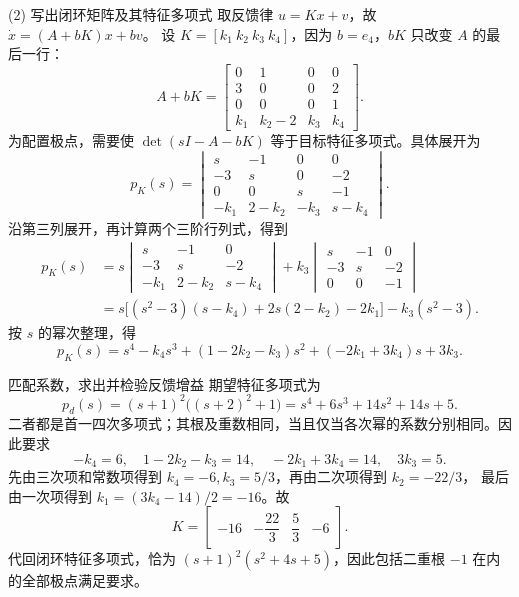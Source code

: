 \documentclass[11pt]{article}
\begin{document}
\begin{solution}
\pagebreak
\begin{proofstep}{(2) 写出闭环矩阵及其特征多项式}
取反馈律 $u=Kx+v$，故 $\dot x=(A+bK)x+bv$。
设 $K=[k_1\ k_2\ k_3\ k_4]$，因为 $b=e_4$，$bK$ 只改变 $A$ 的最后一行：
\[
A+bK=\begin{bmatrix}
0&1&0&0\\3&0&0&2\\0&0&0&1\\k_1&k_2-2&k_3&k_4
\end{bmatrix}.
\]
为配置极点，需要使 $\det(sI-A-bK)$ 等于目标特征多项式。具体展开为
\[
p_K(s)=\begin{vmatrix}
s&-1&0&0\\-3&s&0&-2\\0&0&s&-1\\-k_1&2-k_2&-k_3&s-k_4
\end{vmatrix}.
\]
沿第三列展开，再计算两个三阶行列式，得到
\begin{align*}
p_K(s)
&=s\begin{vmatrix}s&-1&0\\-3&s&-2\\-k_1&2-k_2&s-k_4\end{vmatrix}
+k_3\begin{vmatrix}s&-1&0\\-3&s&-2\\0&0&-1\end{vmatrix}\\
&=s\bigl[(s^2-3)(s-k_4)+2s(2-k_2)-2k_1\bigr]-k_3(s^2-3).
\end{align*}
按 $s$ 的幂次整理，得
\[
p_K(s)
=s^4-k_4s^3+(1-2k_2-k_3)s^2+(-2k_1+3k_4)s+3k_3.
\]
\end{proofstep}

\begin{proofstep}{匹配系数，求出并检验反馈增益}
期望特征多项式为
\[
p_d(s)=(s+1)^2\bigl((s+2)^2+1\bigr)
=s^4+6s^3+14s^2+14s+5.
\]
二者都是首一四次多项式；其根及重数相同，当且仅当各次幂的系数分别相同。因此要求
\[
-k_4=6,\quad 1-2k_2-k_3=14,\quad -2k_1+3k_4=14,\quad 3k_3=5.
\]
先由三次项和常数项得到 $k_4=-6,k_3=5/3$，再由二次项得到 $k_2=-22/3$，
最后由一次项得到 $k_1=(3k_4-14)/2=-16$。故
\[
\boxed{K=\begin{bmatrix}-16&-\dfrac{22}{3}&\dfrac53&-6\end{bmatrix}.}
\]
代回闭环特征多项式，恰为 $(s+1)^2(s^2+4s+5)$，因此包括二重根 $-1$ 在内的全部极点满足要求。
\end{proofstep}
\end{solution}
\end{document}
